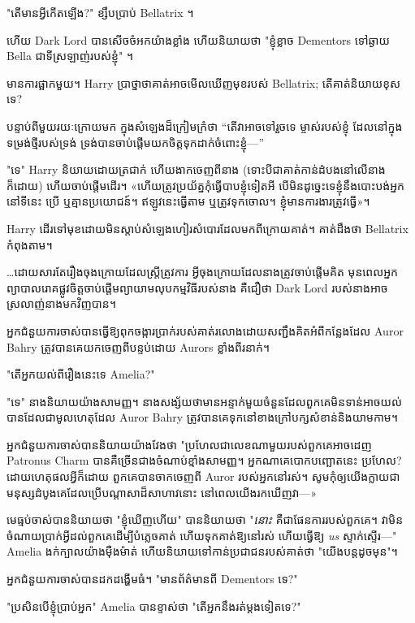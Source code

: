 {{{"តើមានអ្វីកើតឡើង?" ខ្សឹបប្រាប់ Bellatrix ។

ហើយ Dark Lord បានសើចចំអកយ៉ាងខ្លាំង ហើយនិយាយថា "ខ្ញុំខ្លាច Dementors ទៅឆ្ងាយ Bella ជាទីស្រឡាញ់របស់ខ្ញុំ" ។

មានការផ្អាកមួយ។ Harry ប្រាថ្នាថាគាត់អាចមើលឃើញមុខរបស់ Bellatrix; តើគាត់និយាយខុសទេ?

បន្ទាប់ពីមួយរយៈក្រោយមក ក្នុងសំឡេងដ៏ក្រៀមក្រំថា “តើវាអាចទៅរួចទេ ម្ចាស់របស់ខ្ញុំ ដែលនៅក្នុងទម្រង់ថ្មីរបស់ទ្រង់ ទ្រង់បានចាប់ផ្តើមយកចិត្តទុកដាក់ចំពោះខ្ញុំ—”

"ទេ" Harry និយាយដោយត្រជាក់ ហើយងាកចេញពីនាង (ទោះបីជាគាត់កាន់ដំបងនៅលើនាងក៏ដោយ) ហើយចាប់ផ្តើមដើរ។ «ហើយ​ត្រូវ​ប្រយ័ត្ន​កុំ​ធ្វើ​បាប​ខ្ញុំ​ទៀត​អី បើ​មិន​ដូច្នេះ​ទេ​ខ្ញុំ​នឹង​បោះ​បង់​អ្នក​នៅ​ទី​នេះ ប្រើ ឬ​គ្មាន​ប្រយោជន៍។ ឥឡូវនេះធ្វើតាម ឬត្រូវទុកចោល។ ខ្ញុំ​មាន​ការងារ​ត្រូវ​ធ្វើ»។

Harry ដើរទៅមុខដោយមិនស្តាប់សំឡេងហៀរសំបោរដែលមកពីក្រោយគាត់។ គាត់ដឹងថា Bellatrix កំពុងតាម។

…ដោយសារតែរឿងចុងក្រោយដែលស្ត្រីត្រូវការ អ្វីចុងក្រោយដែលនាងត្រូវចាប់ផ្តើមគិត មុនពេលអ្នកព្យាបាលរោគផ្លូវចិត្តចាប់ផ្តើមព្យាយាមលុបកម្មវិធីរបស់នាង គឺជឿថា Dark Lord របស់នាងអាចស្រលាញ់នាងមកវិញបាន។

\later

អ្នកជំនួយការចាស់បានធ្វើឱ្យពុកចង្ការប្រាក់របស់គាត់រលោងដោយសញ្ជឹងគិតអំពីកន្លែងដែល Auror Bahry ត្រូវបានគេយកចេញពីបន្ទប់ដោយ Aurors ខ្លាំងពីរនាក់។

"តើអ្នកយល់ពីរឿងនេះទេ Amelia?"

"ទេ" នាងនិយាយយ៉ាងសាមញ្ញ។ នាង​សង្ស័យ​ថា​មាន​អន្ទាក់​មួយ​ចំនួន​ដែល​ពួក​គេ​មិន​ទាន់​អាច​យល់​បាន​ដែល​ជា​មូល​ហេតុ​ដែល​ Auror Bahry ត្រូវ​បាន​គេ​ទុក​នៅ​ខាង​ក្រៅ​បក្ស​សំខាន់​និង​យាម​កាម។

អ្នកជំនួយការចាស់បាននិយាយយ៉ាងវែងថា "ប្រហែលជាលេខណាមួយរបស់ពួកគេអាចដេញ Patronus Charm បានគឺច្រើនជាងចំណាប់ខ្មាំងសាមញ្ញ។ អ្នកណាគេបោកបញ្ឆោតនេះ ប្រហែល? ដោយហេតុផលអ្វីក៏ដោយ ពួកគេបានចាកចេញពី Auror របស់អ្នកនៅរស់។ សូម​កុំ​ឲ្យ​យើង​ក្លាយ​ជា​មនុស្ស​ដំបូង​គេ​ដែល​ប្រើ​បណ្តាសា​ដ៏​សាហាវ​នោះ នៅ​ពេល​យើង​រក​ឃើញ​វា—»

មេធ្មប់ចាស់បាននិយាយថា "ខ្ញុំឃើញហើយ" បាននិយាយថា "\emph{នោះ} គឺជាផែនការរបស់ពួកគេ។ វា​មិន​ចំណាយ​ប្រាក់​អ្វី​ដល់​ពួកគេ​ដើម្បី​បំភ្លេច​គាត់ ហើយ​ទុក​គាត់​ឱ្យ​នៅ​រស់ ហើយ​ធ្វើ​ឱ្យ \emph{us} ស្ទាក់ស្ទើរ—" Amelia ងក់​ក្បាល​យ៉ាង​ម៉ឺងម៉ាត់ ហើយ​និយាយ​ទៅកាន់​ប្រជាជន​របស់គាត់​ថា "យើង​បន្ត​ដូច​មុន"។

អ្នកជំនួយការចាស់បានដកដង្ហើមធំ។ "មានព័ត៌មានពី Dementors ទេ?"

"ប្រសិនបើខ្ញុំប្រាប់អ្នក" Amelia បានខ្ទាស់ថា "តើអ្នកនឹងរត់ម្តងទៀតទេ?"

}}}
